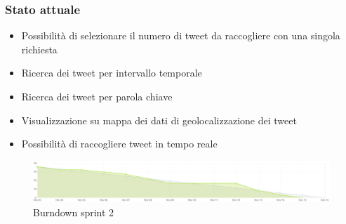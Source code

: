 \documentclass{beamer}
\begin{document}
\begin{frame}
  \frametitle{Stato attuale}
  \begin{itemize}
    \item Possibilità di selezionare il numero di tweet da raccogliere con una singola richiesta
    \item Ricerca dei tweet per intervallo temporale
    \item Ricerca dei tweet per parola chiave
    \item Visualizzazione su mappa dei dati di geolocalizzazione dei tweet
    \item Possibilità di raccogliere tweet in tempo reale
  \end{itemize}
  \begin{figure}
    \centering
    \includegraphics[width=\textwidth]{./img/burndown.png}
    \caption{Burndown sprint 2}
  \end{figure}
\end{frame}
\end{document}
